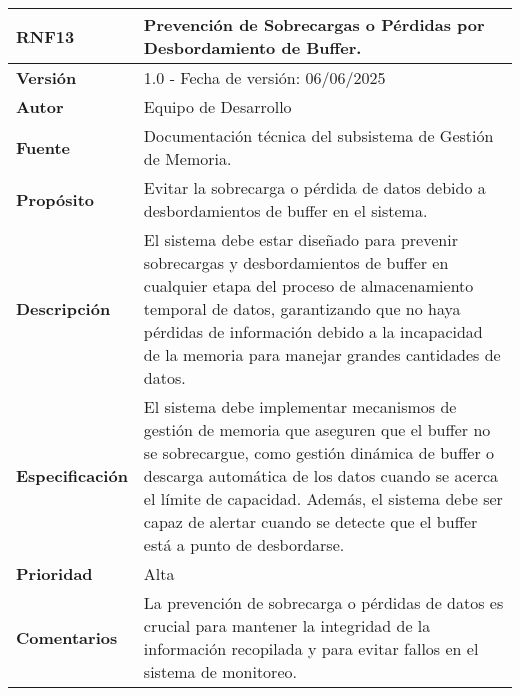 \begin{longtable}{|l|p{12cm}|}
\hline
\textbf{RNF13} & \textbf{Prevención de Sobrecargas o Pérdidas por Desbordamiento de Buffer.} \\
\hline
\endfirsthead
\hline
\textbf{Versión} & 1.0 - Fecha de versión: 06/06/2025 \\
\hline
\textbf{Autor} & Equipo de Desarrollo \\
\hline
\textbf{Fuente} & Documentación técnica del subsistema de Gestión de Memoria. \\
\hline
\textbf{Propósito} & Evitar la sobrecarga o pérdida de datos debido a desbordamientos de buffer en el sistema. \\
\hline
\textbf{Descripción} & El sistema debe estar diseñado para prevenir sobrecargas y desbordamientos de buffer en cualquier etapa del proceso de almacenamiento temporal de datos, garantizando que no haya pérdidas de información debido a la incapacidad de la memoria para manejar grandes cantidades de datos. \\
\hline
\textbf{Especificación} & El sistema debe implementar mecanismos de gestión de memoria que aseguren que el buffer no se sobrecargue, como gestión dinámica de buffer o descarga automática de los datos cuando se acerca el límite de capacidad. Además, el sistema debe ser capaz de alertar cuando se detecte que el buffer está a punto de desbordarse. \\
\hline
\textbf{Prioridad} & Alta \\
\hline
\textbf{Comentarios} & La prevención de sobrecarga o pérdidas de datos es crucial para mantener la integridad de la información recopilada y para evitar fallos en el sistema de monitoreo. \\
\hline
\end{longtable}

